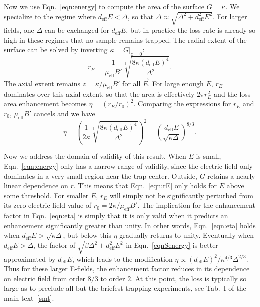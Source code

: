 \documentclass[%
 reprint,
 amsmath,amssymb,
 aps,
pra,
]{revtex4-1}
\begin{document}
Now we use Eqn.~\ref{eqn:energy} to compute the area of the surface $G=\kappa$.
We specialize to the regime where $d_\text{eff}E<\Delta$, so that $\Delta\approx\sqrt{\Delta^2+d_\text{eff}^2E^2}$. 
For larger fields, one $\Delta$ can be exchanged for $d_\text{eff}E$, but in practice the loss rate is already so high in these regimes that no sample remains trapped.
The radial extent of the surface can be solved by inverting $\kappa=G|_{z=0}$:
\begin{equation}
\label{eqn:rE}
r_E = \frac{1}{\mu_\text{eff}B'}\sqrt[3]{\frac{8\kappa(d_\text{eff}E)^4}{\Delta^2}}.
\end{equation}
The axial extent remains $z=\kappa/\mu_\text{eff}B'$ for all $\vec{E}$.
For large enough $E$, $r_E$ dominates over this axial extent, so that the area is effectively $2\pi r_E^2$ and the loss area enhancement becomes $\eta = (r_E/r_0)^2$.
Comparing the expressions for $r_E$ and $r_0$, $\mu_\text{eff}B'$ cancels and we have
\begin{equation}
\label{eqn:eta}
\eta= \left(\frac{1}{2\kappa}\sqrt[3]{\frac{8\kappa(d_\text{eff}E)^4}{\Delta^2}}\right)^2=\left(\frac{d_\text{eff}E}{\sqrt{\kappa\Delta}}\right)^{8/3}.
\end{equation}

Now we address the domain of validity of this result. 
When $E$ is small, Eqn.~\ref{eqn:energy} only has a narrow range of validity, since the electric field only dominates in a very small region near the trap center. 
Outside, $G$ retains a nearly linear dependence on $r$. 
This means that Eqn.~\ref{eqn:rE} only holds for $E$ above some threshold. 
For smaller $E$, $r_E$ will simply not be significantly perturbed from its zero electric field value of $r_0=2\kappa/\mu_\text{eff}B'$.
The implication for the enhancement factor in Eqn.~\ref{eqn:eta} is simply that it is only valid when it predicts an enhancement significantly greater than unity.
In other words, Eqn.~\ref{eqn:eta} holds when $d_\text{eff}E>\sqrt{\kappa\Delta}$, but below this $\eta$ gradually returns to unity.
Eventually when $d_\text{eff}E>\Delta$, the factor of $\sqrt{\beta\Delta^2+d_\text{eff}^2E^2}$ in Eqn.~\ref{eqnSenergy} is better approximated by $d_\text{eff}E$, which leads to the modification $\eta\propto (d_\text{eff}E)^2/\kappa^{4/3}\Delta^{2/3}$. 
Thus for these larger E-fields, the enhancement factor reduces in its dependence on electric field from order $8/3$ to order $2$.
At this point, the loss is typically so large as to preclude all but the briefest trapping experiments, see Tab.~I of the main text~\ref{smt}.





\end{document}
